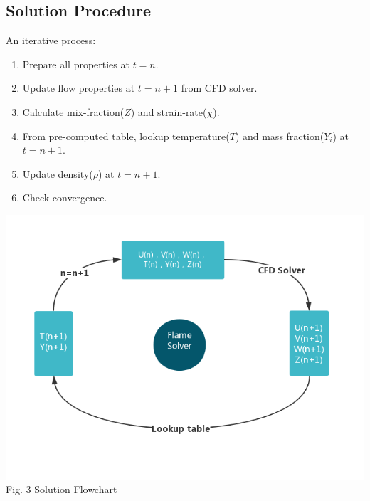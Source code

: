 \documentclass[a0,portrait]{a0poster}
\begin{document}
\begin{multicols}{2}
\color{SaddleBrown}
\section*{Solution Procedure}
	\vspace{-1.5cm}
	\setlength\columnseprule{0pt}
	\begin{multicols}{2}
		\color{DarkSlateGray}
		An iterative process:
		\begin{enumerate}[(1)]
			\item Prepare all properties at $t=n$.
			\item Update flow properties at $t=n+1$ from CFD solver.
			\item Calculate mix-fraction($Z$) and strain-rate($\chi$).
			\item From pre-computed table, lookup temperature($T$) and mass fraction($Y_i$) at $t=n+1$.
			\item Update density($\rho$) at $t=n+1$.
			\item Check convergence.
		\end{enumerate}
		
		\begin{center}
			\includegraphics[width=\linewidth]{pic/solver.png}\\
			{\color{Green} Fig. 3 Solution Flowchart}
		\end{center}
	
	\end{multicols}
	\setlength\columnseprule{3pt}

\color{SaddleBrown}

\end{multicols}
\end{document}
